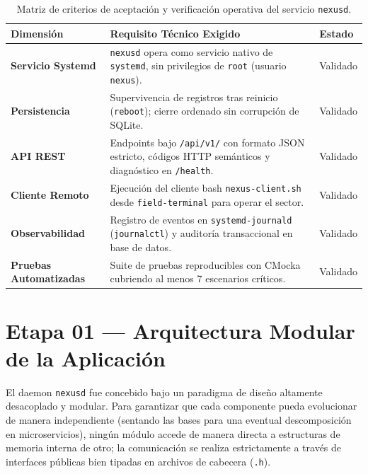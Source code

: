 \documentclass[10pt,a4paper]{article}
\begin{document}
\begin{table}[H]
    \centering
    \footnotesize
    \caption{Matriz de criterios de aceptación y verificación operativa del servicio \texttt{nexusd}.}
    \label{tab:criterios_aceptacion}
    \begin{tabularx}{\textwidth}{lXl}
        \toprule
        \rowcolor{tableheader}
        \textbf{Dimensión} & \textbf{Requisito Técnico Exigido} & \textbf{Estado} \\
        \midrule
        \textbf{Servicio Systemd} & \texttt{nexusd} opera como servicio nativo de \texttt{systemd}, sin privilegios de \texttt{root} (usuario \texttt{nexus}). & Validado \\
        \rowcolor{rowalt}
        \textbf{Persistencia} & Supervivencia de registros tras reinicio (\texttt{reboot}); cierre ordenado sin corrupción de SQLite. & Validado \\
        \textbf{API REST} & Endpoints bajo \texttt{/api/v1/} con formato JSON estricto, códigos HTTP semánticos y diagnóstico en \texttt{/health}. & Validado \\
        \rowcolor{rowalt}
        \textbf{Cliente Remoto} & Ejecución del cliente bash \texttt{nexus-client.sh} desde \texttt{field-terminal} para operar el sector. & Validado \\
        \textbf{Observabilidad} & Registro de eventos en \texttt{systemd-journald} (\texttt{journalctl}) y auditoría transaccional en base de datos. & Validado \\
        \rowcolor{rowalt}
        \textbf{Pruebas Automatizadas} & Suite de pruebas reproducibles con CMocka cubriendo al menos 7 escenarios críticos. & Validado \\
        \bottomrule
    \end{tabularx}
\end{table}

\section{Etapa 01 — Arquitectura Modular de la Aplicación}

El daemon \texttt{nexusd} fue concebido bajo un paradigma de diseño altamente desacoplado y modular. Para garantizar que cada componente pueda evolucionar de manera independiente (sentando las bases para una eventual descomposición en microservicios), ningún módulo accede de manera directa a estructuras de memoria interna de otro; la comunicación se realiza estrictamente a través de interfaces públicas bien tipadas en archivos de cabecera (\texttt{.h}).
\end{document}
